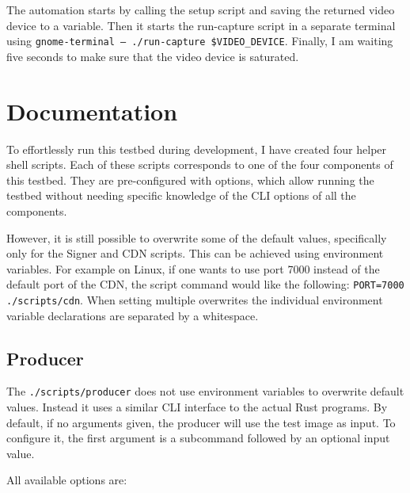The automation starts by calling the setup script and saving the returned video device to a variable. Then it starts the run-capture script in a separate terminal using \texttt{gnome-terminal -- ./run-capture \$VIDEO\_DEVICE}. Finally, I am waiting five seconds to make sure that the video device is saturated. 

\section{Documentation\label{sec:docu}}

To effortlessly run this testbed during development, I have created four helper shell scripts. Each of these scripts corresponds to one of the four components of this testbed. They are pre-configured with options, which allow running the testbed without needing specific knowledge of the CLI options of all the components. 

However, it is still possible to overwrite some of the default values, specifically only for the Signer and CDN scripts. This can be achieved using environment variables. For example on Linux, if one wants to use port 7000 instead of the default port of the CDN, the script command would like the following: \texttt{PORT=7000 ./scripts/cdn}. When setting multiple overwrites the individual environment variable declarations are separated by a whitespace.

\subsection{Producer}

The \texttt{./scripts/producer} does not use environment variables to overwrite default values. Instead it uses a similar CLI interface to the actual Rust programs. By default, if no arguments given, the producer will use the test image as input. To configure it, the first argument is a subcommand followed by an optional input value. 

All available options are:


